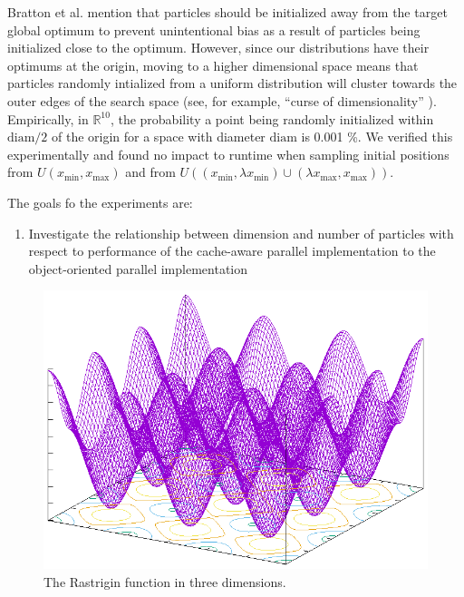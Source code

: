 Bratton et al. \cite{spso} mention that particles should be initialized away
from the target global optimum to prevent unintentional bias as a result of
particles being initialized close to the optimum. However, since our
distributions have their optimums at the origin, moving to a higher dimensional
space means that particles randomly intialized from a uniform distribution will
cluster towards the outer edges of the search space (see, for example, ``curse
of dimensionality'' \cite{hastie}). Empirically, in $\mathbb{R}^{10}$, the
probability a point being randomly initialized within $\text{diam}/2$ of the origin for a space with
diameter $\text{diam}$ is 0.001 \%.
We verified this experimentally and found no
impact to runtime when sampling initial positions from $U(x_{\min}, x_{\max})$
and from $U((x_{\min},\lambda x_{\min})\cup(\lambda x_{\max}, x_{\max}))$.


The goals fo the experiments are:
\begin{enumerate}
  \item Investigate the relationship between dimension and number of particles
    with respect to performance of the cache-aware parallel implementation to
    the object-oriented parallel implementation
\end{enumerate}

\begin{figure}
  \includegraphics[width=\columnwidth]{../img/output/rastrigin}
  \caption{The Rastrigin function in three dimensions.}\label{fig:rastrigin}
\end{figure}


